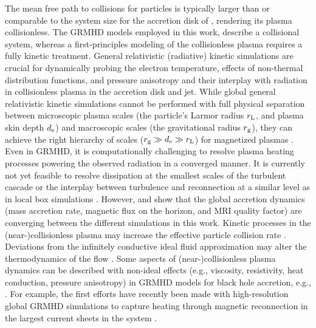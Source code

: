 {The mean free path to collisions for particles is typically larger than or comparable to the system size for the accretion disk of \sgra, rendering its plasma collisionless. The GRMHD models employed in this work, describe a collisional system, whereas a first-principles modeling of the collisionless plasma requires a fully kinetic treatment. General relativistic (radiative) kinetic simulations are crucial for dynamically probing the electron temperature, effects of non-thermal distribution functions, and pressure anisotropy and their interplay with radiation in collisionless plasma in the accretion disk and jet. While global general relativistic kinetic simulations cannot be performed with full physical separation between microscopic plasma scales (the particle's Larmor radius $r_{\rm L}$, and plasma skin depth $d_{\rm e}$) and macroscopic scales (the gravitational radius $r_{\rm g}$), they can achieve the right hierarchy of scales ($r_{\rm g} \gg d_{\rm e} \gg r_{\rm L}$) for magnetized plasmas \citep{2018A&A...616A.184L,2018ApJ...863L..31C,2019PhRvL.122c5101P,2020PhRvL.124n5101C,2020ApJ...895..121C,2020ApJ...902...80K,2021A&A...650A.163C,2021PhRvL.127e5101B}. Even in GRMHD, it is computationally challenging to resolve plasma heating processes powering the observed radiation in a converged manner. It is currently not yet feasible to resolve dissipation at the smallest scales of the turbulent cascade or the interplay between turbulence and reconnection at a similar level as in local box simulations \citep{2012ApJ...755...50R,2013ApJ...773..118H,2015PhRvL.114f1101H,2016PhRvL.117w5101K,2017PhRvL.118e5103Z,2018PhRvL.121y5101C,2018ApJ...859..149I,2019PhRvL.122e5101Z,2021ApJ...921...87N,2021arXiv211108188C}. However, \citet{2019ApJS..243...26P} and \citet[in prep.]{Olivares_et_al} show that the global accretion dynamics (mass accretion rate, magnetic flux on the horizon, and MRI quality factor) are converging between the different simulations in this work. Kinetic processes in the (near-)collisionless plasma may increase the effective particle collision rate \citep[see e.g.,][]{2016PhRvL.117w5101K}. Deviations from the infinitely conductive ideal fluid approximation may alter the thermodynamics of the flow \citep[see e.g., ][and Appendix C1]{2017MNRAS.470.2240F}. Some aspects of (near-)collisionless plasma dynamics can be described with non-ideal effects (e.g., viscosity, resistivity, heat conduction, pressure anisotropy) in GRMHD models for black hole accretion, e.g.,  \cite{2014MNRAS.440L..41B,2015ApJ...810..162C,2016MNRAS.456.1332F,2017ApJ...837...92C,2017MNRAS.470.2240F,2018ApJ...859...28Q,2019ApJS..244...10R,2019ApJ...882....2V,2020ApJ...900..100R,2021PhRvD.104j3028M,2021arXiv211103689N,2021arXiv211105752M}. For example, the first efforts have recently been made with high-resolution global GRMHD simulations to capture heating through magnetic reconnection in the largest current sheets in the system \citep{2020MNRAS.495.1549N,2020ApJ...900..100R,2021MNRAS.508.1241C,2021arXiv210915115R,2021arXiv211103689N}.}

